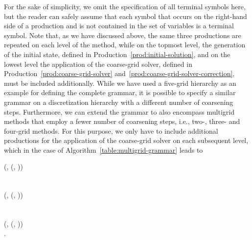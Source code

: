 For the sake of simplicity, we omit the specification of all terminal symbols here, but the reader can safely assume that each symbol that occurs on the right-hand side of a production and is not contained in the set of variables is a terminal symbol.
Note that, as we have discussed above, the same three productions are repeated on each level of the method, while on the topmost level, the generation of the initial state, defined in Production~\eqref{prod:initial-solution}, and on the lowest level the application of the coarse-grid solver, defined in Production~\eqref{prod:coarse-grid-solver} and~\eqref{prod:coarse-grid-solver-correction}, must be included additionally.
While we have used a five-grid hierarchy as an example for defining the complete grammar, it is possible to specify a similar grammar on a discretization hierarchy with a different number of coarsening steps.
Furthermore, we can extend the grammar to also encompass multigrid methods that employ a fewer number of coarsening steps, i.e., two-, three- and four-grid methods.
For this purpose, we only have to include additional productions for the application of the coarse-grid solver on each subsequent level, which in the case of Algorithm~\ref{table:multigrid-grammar} leads to
\begin{bnf*}
	 {
		(, \bnfsp {}(, \bnfsp{}))
	} \\
	 \\ \\
	 {
		(, \bnfsp {}(, \bnfsp{}))
	} \\
	 \\ \\
	 {
		(, \bnfsp {}(, \bnfsp{}))
	} \\
	.
\end{bnf*}
